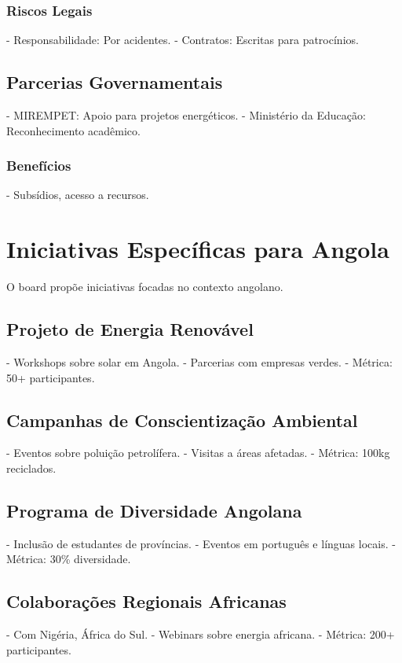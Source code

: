 \documentclass[12pt]{article}
\begin{document}
\subsubsection{Riscos Legais}
- Responsabilidade: Por acidentes.
- Contratos: Escritas para patrocínios.

\subsection{Parcerias Governamentais}
- MIREMPET: Apoio para projetos energéticos.
- Ministério da Educação: Reconhecimento acadêmico.

\subsubsection{Benefícios}
- Subsídios, acesso a recursos.

\section{Iniciativas Específicas para Angola}

O board propõe iniciativas focadas no contexto angolano.

\subsection{Projeto de Energia Renovável}
- Workshops sobre solar em Angola.
- Parcerias com empresas verdes.
- Métrica: 50+ participantes.

\subsection{Campanhas de Conscientização Ambiental}
- Eventos sobre poluição petrolífera.
- Visitas a áreas afetadas.
- Métrica: 100kg reciclados.

\subsection{Programa de Diversidade Angolana}
- Inclusão de estudantes de províncias.
- Eventos em português e línguas locais.
- Métrica: 30\% diversidade.

\subsection{Colaborações Regionais Africanas}
- Com Nigéria, África do Sul.
- Webinars sobre energia africana.
- Métrica: 200+ participantes.
\end{document}
